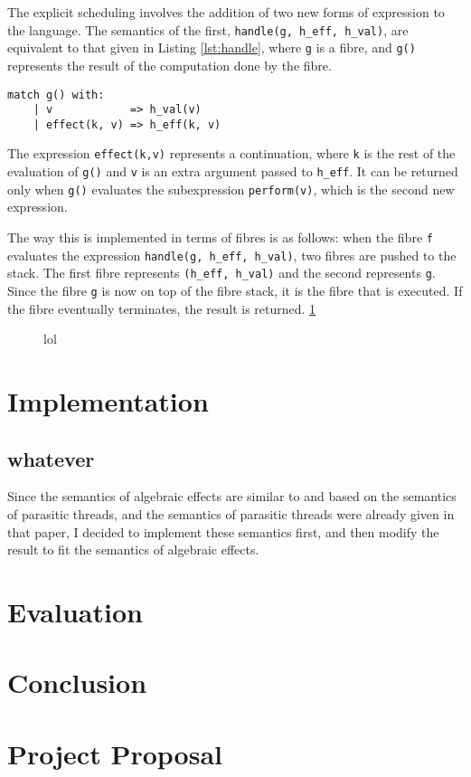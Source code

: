 \documentclass[12pt,a4paper,twoside,openright]{report}
\begin{document}
The explicit scheduling involves the addition of two new forms of expression to the language. The semantics of the first, \texttt{handle(g, h\_eff, h\_val)}, are equivalent to that given in Listing \ref{lst:handle}, where \texttt{g} is a fibre, and \texttt{g()} represents the result of the computation done by the fibre.


\begin{lstlisting}[caption=The semantics of \texttt{handle},label={lst:handle}]
  match g() with:
    | v            => h_val(v)
    | effect(k, v) => h_eff(k, v)
\end{lstlisting}

The expression \texttt{effect(k,v)} represents a continuation, where \texttt{k} is the rest of the evaluation of \texttt{g()} and \texttt{v} is an extra argument passed to \texttt{h\_eff}. It can be returned only when \texttt{g()} evaluates the subexpression \texttt{perform(v)}, which is the second new expression.

The way this is implemented in terms of fibres is as follows: when the fibre \texttt{f} evaluates the expression \texttt{handle(g, h\_eff, h\_val)}, two fibres are pushed to the stack. The first fibre represents \texttt{(h\_eff, h\_val)} and the second represents \texttt{g}. Since the fibre \texttt{g} is now on top of the fibre stack, it is the fibre that is executed. If the fibre eventually terminates, the result is returned. \ref{fig:lmao}

\begin{figure}
\centering
\caption{lol}
\label{fig:lmao}
\end{figure}

\chapter{Implementation}

\section{whatever}

Since the semantics of algebraic effects are similar to and based on the semantics of parasitic threads, and the semantics of parasitic threads were already given in that paper, I decided to implement these semantics first, and then modify the result to fit the semantics of algebraic effects.



\chapter{Evaluation}

\chapter{Conclusion}


\appendix

\chapter{Project Proposal}
\end{document}
